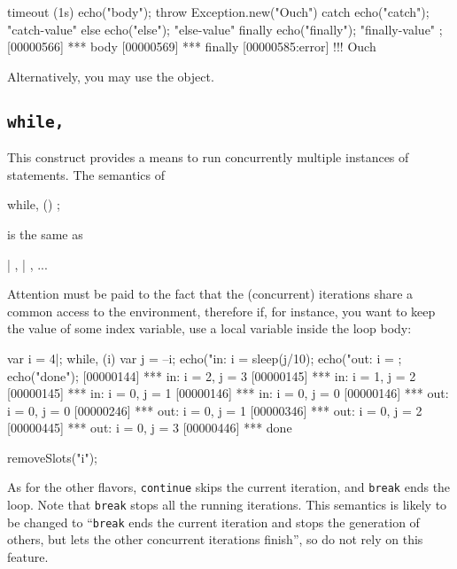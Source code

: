 \begin{urbiscript}
timeout (1s)  { echo("body"); throw Exception.new("Ouch") }
catch         { echo("catch"); "catch-value" }
else          { echo("else"); "else-value" }
finally       { echo("finally"); "finally-value" };
[00000566] *** body
[00000569] *** finally
[00000585:error] !!! Ouch
\end{urbiscript}

Alternatively, you may use the  object.

\subsection{\lstinline{while,}}
\label{sec:lang:while:comma}
\experimentalremoved{}

This construct provides a means to run concurrently multiple instances
of statements.  The semantics of

\begin{urbiunchecked}
while, ()
  ;
\end{urbiunchecked}

\noindent
is the same as

\begin{urbiunchecked}
 |  ,  |  , ...
\end{urbiunchecked}

Attention must be paid to the fact that the (concurrent) iterations
share a common access to the environment, therefore if, for instance,
you want to keep the value of some index variable, use a local
variable inside the loop body:

\begin{urbiscript}[firstnumber=1]
var i = 4|;
while, (i)
{
  var j = --i;
  echo("in: i = %
  sleep(j/10);
  echo("out: i = %
};
echo("done");
[00000144] *** in: i = 2, j = 3
[00000145] *** in: i = 1, j = 2
[00000145] *** in: i = 0, j = 1
[00000146] *** in: i = 0, j = 0
[00000146] *** out: i = 0, j = 0
[00000246] *** out: i = 0, j = 1
[00000346] *** out: i = 0, j = 2
[00000445] *** out: i = 0, j = 3
[00000446] *** done
\end{urbiscript}
\begin{urbicomment}
removeSlots("i");
\end{urbicomment}

As for the other flavors, \lstinline{continue} skips the current iteration,
and \lstinline{break} ends the loop.  Note that \lstinline{break} stops all
the running iterations.  This semantics is likely to be changed to
``\lstinline{break} ends the current iteration and stops the generation of
others, but lets the other concurrent iterations finish'', so do not rely on
this feature.

